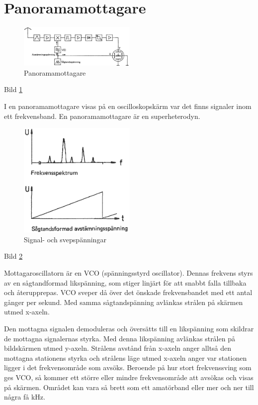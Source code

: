 \section{Panoramamottagare}

\begin{figure}
  \includegraphics[width=0.5\textwidth]{images/cropped_pdfs/bild_2_4-15.pdf}
  \caption{Panoramamottagare}
  \label{fig:bildII4-15}
\end{figure}

Bild \ref{fig:bildII4-15}

I en panoramamottagare visas på en oscilloskopskärm var det finns
signaler inom ett frekvensband. En panoramamottagare är en
superheterodyn.

\begin{figure}
  \includegraphics[width=0.5\textwidth]{images/cropped_pdfs/bild_2_4-17.pdf}
  \caption{Signal- och svepspänningar}
  \label{fig:bildII4-17}
\end{figure}

Bild \ref{fig:bildII4-17}

Mottagaroscillatorn är en VCO (spänningsstyrd oscillator). Dennas
frekvens styrs av en sågtandformad likspänning, som stiger linjärt för
att snabbt falla tillbaka och återupprepas. VCO sveper då över det
önskade frekvensbandet med ett antal gånger per sekund. Med
samma sågtandspänning avlänkas strålen på skärmen utmed x-axeln.

Den mottagna signalen demoduleras och översätts till en likspänning
som skildrar de mottagna signalernas styrka. Med denna likspänning
avlänkas strålen på bildskärmen utmed y-axeln. Strålens avstånd från
x-axeln anger alltså den mottagna stationens styrka och strålens läge
utmed x-axeln anger var stationen ligger i det frekvensområde som
avsöks. Beroende på hur stort frekvenssving som ges VCO, så kommer ett
större eller mindre frekvensområde att avsökas och visas på
skärmen. Området kan vara så brett som ett amatörband eller mer och
ner till några få kHz.

